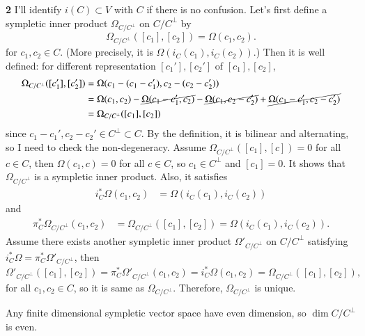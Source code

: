 \documentclass[a4paper, 12pt]{article}
\theoremstyle{Mydefinition}
\theoremstyle{Mytheorem}
\begin{document}
\noindent \textbf{2}
I'll identify $i(C)\subset V$ with $C$ if there is no confusion. Let's first define a sympletic inner product $\Omega_{C/C^\perp}$ on $C/C^\perp$ by
\begin{equation*}
    \Omega_{C/C^\perp}([c_1], [c_2]) = \Omega(c_1, c_2).
\end{equation*}
for $c_1,c_2\in C$. (More precisely, it is $\Omega(i_C(c_1), i_C(c_2))$.) Then it is well defined: for different representation $[c_1'],[c_2']$ of $[c_1],[c_2]$,
\begin{equation*}
\begin{split}
    \Omega_{C/C^\perp}([c_1'], [c_2']) &= \Omega(c_1 - (c_1 - c_1'), c_2 - (c_2 - c_2'))\\
    &=\Omega(c_1, c_2) - \cancel{\Omega(c_1-c_1', c_2)} - \cancel{\Omega(c_1, c_2-c_2')} + \cancel{\Omega(c_1-c_1', c_2-c_2')}\\
    &=\Omega_{C/C^\perp}([c_1], [c_2])
\end{split}
\end{equation*}
since $c_1-c_1',c_2-c_2'\in C^\perp\subset C$. By the definition, it is bilinear and alternating, so I need to check the non-degeneracy. Assume $\Omega_{C/C^\perp}([c_1], [c]) = 0$ for all $c\in C$, then $\Omega(c_1, c) = 0$ for all $c\in C$, so $c_1\in C^\perp$ and $[c_1]=0$. It shows that $\Omega_{C/C^\perp}$ is a sympletic inner product. Also, it satisfies
\begin{equation*}
\begin{split}
    i_C^*\Omega(c_1,c_2) &=\Omega(i_C(c_1),i_C(c_2))
\end{split}
\end{equation*}
and
\begin{equation*}
\begin{split}
    \pi_C^*\Omega_{C/C^\perp}(c_1,c_2) &=\Omega_{C/C^\perp}([c_1],[c_2]) = \Omega(i_C(c_1),i_C(c_2)).
\end{split}
\end{equation*}
Assume there exists another sympletic inner product $\Omega'_{C/C^\perp}$ on $C/C^\perp$ satisfying $i_C^*\Omega = \pi_C^*\Omega'_{C/C^\perp}$, then
\begin{equation*}
    \Omega'_{C/C^\perp}([c_1],[c_2]) = \pi_C^*\Omega'_{C/C^\perp}(c_1,c_2) = i_C^*\Omega(c_1,c_2) = \Omega_{C/C^\perp}([c_1],[c_2]),
\end{equation*}
for all $c_1,c_2\in C$, so it is same as $\Omega_{C/C^\perp}$. Therefore, $\Omega_{C/C^\perp}$ is unique.

Any finite dimensional sympletic vector space have even dimension, so $\dim C/C^\perp$ is even.
\end{document}
